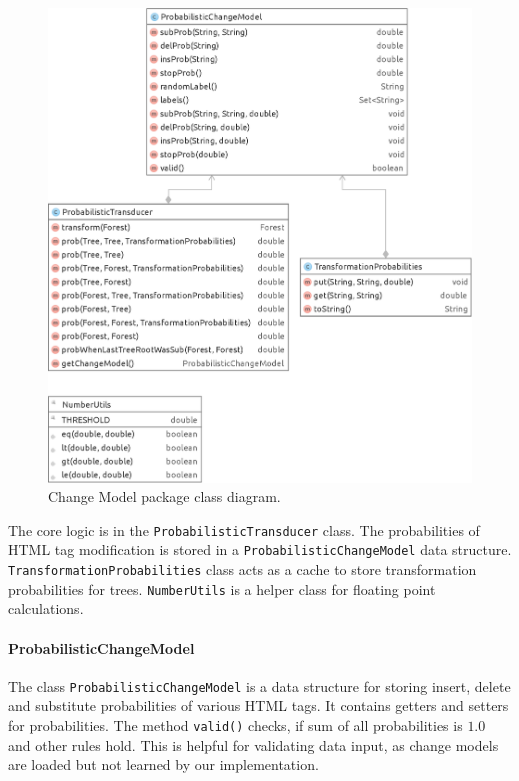 \begin{figure}[h]
	\centering
	\includegraphics[width=1.0\textwidth]{figures/package-changemodel}
	\caption{Change Model package class diagram.}
	\label{fig:package-changemodel}
\end{figure}

The core logic is in the \texttt{ProbabilisticTransducer} class. The probabilities of HTML tag modification is stored in a \texttt{ProbabilisticChangeModel} data structure. \texttt{TransformationProbabilities} class acts as a cache to store transformation probabilities for trees. \texttt{NumberUtils} is a helper class for floating point calculations.


\paragraph{ProbabilisticChangeModel} The class \texttt{ProbabilisticChangeModel} is a data structure for storing insert, delete and substitute probabilities of various HTML tags. It contains getters and setters for probabilities. The method \texttt{valid()} checks, if sum of all probabilities is $1.0$ and other rules hold. This is helpful for validating data input, as change models are loaded but not learned by our implementation.

